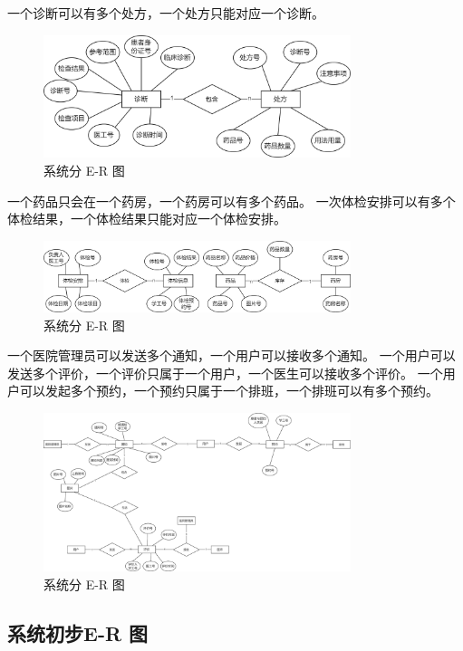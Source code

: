 \documentclass{article}
\begin{document}
一个诊断可以有多个处方，一个处方只能对应一个诊断。

\begin{figure}[H]
    \centering
    \includegraphics[width=0.8\textwidth]{images/dividedER3.png}
    \caption{系统分 E-R 图}
\end{figure}

一个药品只会在一个药房，一个药房可以有多个药品。
一次体检安排可以有多个体检结果，一个体检结果只能对应一个体检安排。

\begin{figure}[H]
    \centering
    \includegraphics[width=0.8\textwidth]{images/dividedER4.png}
    \caption{系统分 E-R 图}
\end{figure}

一个医院管理员可以发送多个通知，一个用户可以接收多个通知。
一个用户可以发送多个评价，一个评价只属于一个用户，一个医生可以接收多个评价。
一个用户可以发起多个预约，一个预约只属于一个排班，一个排班可以有多个预约。

\begin{figure}[H]
    \centering
    \includegraphics[width=0.8\textwidth]{images/dividedER5.png}
    \caption{系统分 E-R 图}
\end{figure}

\subsection{系统初步E-R 图}
\end{document}
